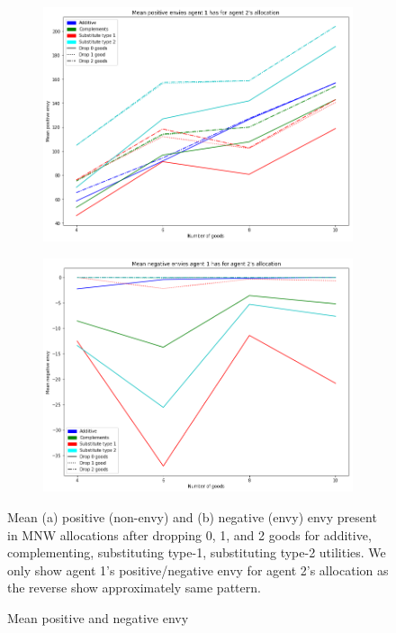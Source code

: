 \begin{figure}[h!]
  \centering
  \begin{subfigure}[b]{\linewidth}
    \includegraphics[width=\linewidth]{images/mean1_2pos.png}
    \caption{}
  \end{subfigure}
  \begin{subfigure}[b]{\linewidth}
    \includegraphics[width=\linewidth]{images/mean1_2neg.png}
    \caption{}
  \end{subfigure}
  \caption{Mean positive and negative envy}
  \label{fig_efk_meanpn}
  \small
    Mean (a) positive (non-envy) and (b) negative (envy) envy present in MNW allocations after dropping 0, 1, and 2 goods for additive, complementing, substituting type-1, substituting type-2 utilities. We only show agent 1's positive/negative envy for agent 2's allocation as the reverse show approximately same pattern.
\end{figure}

